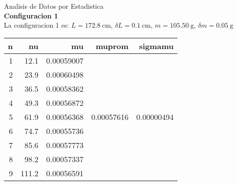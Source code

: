 \documentclass{article}
\begin{document}


Analisis de Datos por Estadistica\\
\textbf{Configuracion 1}\\
La configuracion 1 es: $L=172.8\ \text{cm}$, $\delta L = 0.1\ \text{cm}$, $m=105.50\ \text{g}$, $\delta m = 0.05\ \text{g}$ 
\begin{table}[ht]
\centering
\begin{tabular}{rrrrr}
  \hline
n & nu & mu & muprom & sigmamu \\ 
  \hline
1 & 12.1 & 0.00059007 &  &  \\ 
  2 & 23.9 & 0.00060498 &  &  \\ 
  3 & 36.5 & 0.00058362 &  &  \\ 
  4 & 49.3 & 0.00056872 &  &  \\ 
  5 & 61.9 & 0.00056368 & 0.00057616 & 0.00000494 \\ 
  6 & 74.7 & 0.00055736 &  &  \\ 
  7 & 85.6 & 0.00057773 &  &  \\ 
  8 & 98.2 & 0.00057337 &  &  \\ 
  9 & 111.2 & 0.00056591 &  &  \\ 
   \hline
\end{tabular}
\end{table}
\end{document}
